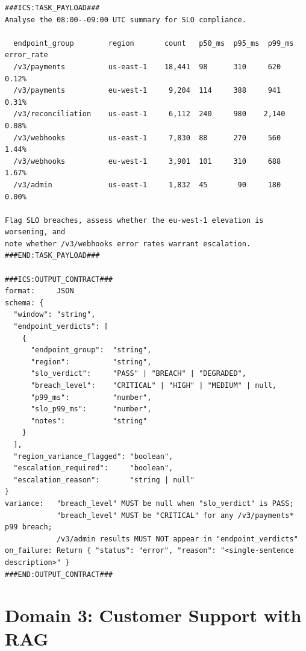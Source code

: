 \documentclass[11pt]{article}
\begin{document}
\begin{lstlisting}[language=ICS, basicstyle=\ttfamily\footnotesize]
###ICS:TASK_PAYLOAD###
Analyse the 08:00--09:00 UTC summary for SLO compliance.

  endpoint_group        region       count   p50_ms  p95_ms  p99_ms  error_rate
  /v3/payments          us-east-1    18,441  98      310     620     0.12%
  /v3/payments          eu-west-1     9,204  114     388     941     0.31%
  /v3/reconciliation    us-east-1     6,112  240     980    2,140    0.08%
  /v3/webhooks          us-east-1     7,830  88      270     560     1.44%
  /v3/webhooks          eu-west-1     3,901  101     310     688     1.67%
  /v3/admin             us-east-1     1,832  45       90     180     0.00%

Flag SLO breaches, assess whether the eu-west-1 elevation is worsening, and
note whether /v3/webhooks error rates warrant escalation.
###END:TASK_PAYLOAD###

###ICS:OUTPUT_CONTRACT###
format:     JSON
schema: {
  "window": "string",
  "endpoint_verdicts": [
    {
      "endpoint_group":  "string",
      "region":          "string",
      "slo_verdict":     "PASS" | "BREACH" | "DEGRADED",
      "breach_level":    "CRITICAL" | "HIGH" | "MEDIUM" | null,
      "p99_ms":          "number",
      "slo_p99_ms":      "number",
      "notes":           "string"
    }
  ],
  "region_variance_flagged": "boolean",
  "escalation_required":     "boolean",
  "escalation_reason":       "string | null"
}
variance:   "breach_level" MUST be null when "slo_verdict" is PASS;
            "breach_level" MUST be "CRITICAL" for any /v3/payments* p99 breach;
            /v3/admin results MUST NOT appear in "endpoint_verdicts"
on_failure: Return { "status": "error", "reason": "<single-sentence description>" }
###END:OUTPUT_CONTRACT###
\end{lstlisting}


\section{Domain 3: Customer Support with RAG}
\label{app:rag}
\end{document}
